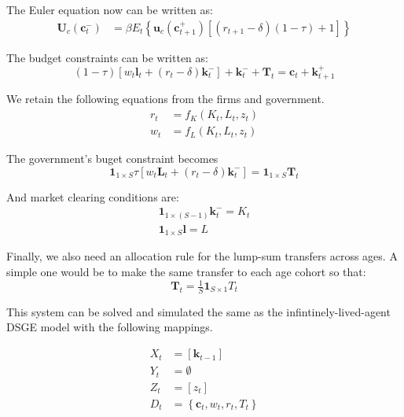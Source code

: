 \documentclass[letterpaper,12pt]{article}
\theoremstyle{definition}
\begin{document}
\begin{spacing}{1.5}
	The Euler equation now can be written as:
	\begin{align}
		\mathbf{U}_c(\mathbf{c}^-_{t})  & = \beta E_t\left\{ \mathbf{u}_c(\mathbf{c}^+_{t+1})[(r_{t+1}-\delta)(1-\tau)+1] \right\} 
	\end{align}

	The budget constraints can be written as:
	\begin{equation}
		(1-\tau) \left[w_t \mathbf{l}_{t}+(r_t-\delta)\mathbf{k}^-_{t}\right] + \mathbf{k}^-_{t} + \mathbf{T}_{t} = \mathbf{c}_{t}+\mathbf{k}^+_{t+1}
	\end{equation}

	We retain the following equations from the firms and government.
	\begin{align}
		r_t & = f_K(K_t,L_t,z_t) \\
		w_t & = f_L(K_t,L_t,z_t)
	\end{align}

	The government's buget constraint becomes
	\begin{equation}
		\mathbf{1}_{1 \times S} \tau \left[w_t \mathbf{L}_t+(r_t-\delta)\mathbf{k}^-_t\right]  = \mathbf{1}_{1 \times S} \mathbf{T}_t
	\end{equation}

	And market clearing conditions are:
	\begin{align}
		\mathbf{1}_{1 \times (S-1)} \mathbf{k}^-_t = K_t \\
		\mathbf{1}_{1 \times S} \mathbf{l} = L
	\end{align}

	Finally, we also need an allocation rule for the lump-sum transfers across ages.  A simple one would be to make the same transfer to each age cohort so that:
	\begin{equation}
		\mathbf{T}_t = \tfrac{1}{S} \mathbf{1}_{S \times 1} T_t
	\end{equation}

	This system can be solved and simulated the same as the infintinely-lived-agent DSGE model with the following mappings.

	\begin{equation}\label{XYZolg}
		\begin{split}
			X_t & = \left[\mathbf{k}_{t-1}\right] \\
			Y_t & = \emptyset \\
			Z_t & = \left[z_t\right] \\
			D_t & = \left\{\mathbf{c}_t,w_t,r_t,T_t\right\}
		\end{split}
	\end{equation}

	
\end{spacing}
{}
\newpage
{}

\end{document}

